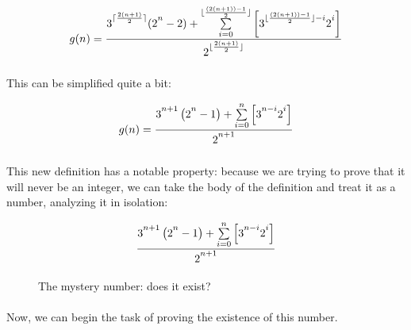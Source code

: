 \documentclass[12pt,letterpaper]{article}
\begin{document}
			\begin{equation*}
				g(n) = \frac{3\strut^{\lceil \frac{2(n + 1)}{2} \rceil} (2\strut^n - 2) + 
					\sum\limits_{i=0}^
					{\lfloor \frac{(2(n + 1))-1}{2} \rfloor} 
					\left[
					3\strut^{\lfloor \frac{(2(n + 1))-1}{2} \rfloor - i}
					2\strut^i 
					\right]}
				{2\strut^{\lfloor \frac{2(n + 1)}{2} \rfloor}}
			\end{equation*}
			
			\paragraph{} This can be simplified quite a bit:
				
			\begin{equation*}
				g(n) =
				\frac{3\strut^{n+1}\left(2\strut^n - 1\right) + 
				\sum\limits_{i=0}^{n} \left[3\strut^{n-i}2\strut^i\right]}
				{2\strut^{n+1}}
			\end{equation*}
			
			\paragraph{} This new definition has a notable property: because we are trying to prove that it will never be an integer, we can take the body of the definition and treat it as a number, analyzing it in isolation:
			
			\begin{figure}[h]
				\begin{equation*}
				\frac{3\strut^{n+1}\left(2\strut^n - 1\right) + 
					\sum\limits_{i=0}^{n} \left[3\strut^{n-i}2\strut^i\right]}
				{2\strut^{n+1}}
				\end{equation*}
				
				\caption{The mystery number: does it exist?}
			\end{figure}
			\newpage %
			
			\paragraph{} Now, we can begin the task of proving the existence of this number.
			
			
						
						
		
\end{document}
